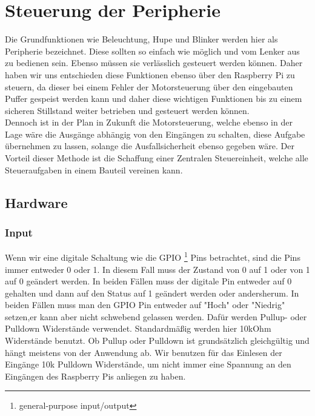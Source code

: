 \newpage


\section{Steuerung der Peripherie}

Die Grundfunktionen wie Beleuchtung, Hupe und Blinker werden hier als Peripherie bezeichnet. Diese sollten so einfach wie möglich und vom Lenker aus zu bedienen sein. Ebenso müssen sie verlässlich gesteuert werden können. Daher haben wir uns entschieden diese Funktionen ebenso über den Raspberry Pi zu steuern, da dieser bei einem Fehler der Motorsteuerung über den eingebauten Puffer gespeist werden kann und daher diese wichtigen Funktionen bis zu einem sicheren Stillstand weiter betrieben und gesteuert werden können.\\


Dennoch ist in der Plan in Zukunft die Motorsteuerung, welche ebenso in der Lage wäre die Ausgänge abhängig von den Eingängen zu schalten, diese Aufgabe übernehmen zu lassen, solange die Ausfallsicherheit ebenso gegeben wäre. Der Vorteil dieser Methode ist die Schaffung einer Zentralen Steuereinheit, welche alle Steueraufgaben in einem Bauteil vereinen kann.

\subsection{Hardware}

\subsubsection{Input}
Wenn wir eine digitale Schaltung wie die GPIO \footnote{general-purpose input/output} Pins betrachtet, sind die Pins immer entweder 0 oder 1. In diesem Fall muss der Zustand von 0 auf 1 oder von 1 auf 0 geändert werden. In beiden Fällen muss der digitale Pin entweder auf 0 gehalten und dann auf den Status auf 1 geändert werden oder andersherum. In beiden Fällen muss man den GPIO Pin entweder auf "Hoch" oder "Niedrig" setzen,er kann aber nicht schwebend gelassen werden. Dafür werden Pullup- oder Pulldown Widerstände verwendet. Standardmäßig werden hier 10kOhm Widerstände benutzt. Ob Pullup oder Pulldown ist grundsätzlich gleichgültig und hängt meistens von der Anwendung ab. Wir benutzen für das Einlesen der Eingänge 10k Pulldown Widerstände, um nicht immer eine Spannung an den Eingängen des Raspberry Pis anliegen zu haben.

